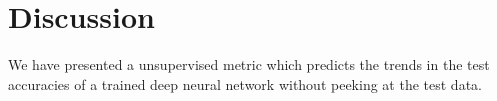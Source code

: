 \vspace{-4mm}
\section{Discussion}
\label{sxn:discussion}
\vspace{-3mm}

We have presented a unsupervised metric which  predicts the trends in the test accuracies of a trained deep neural network without peeking at the test data.